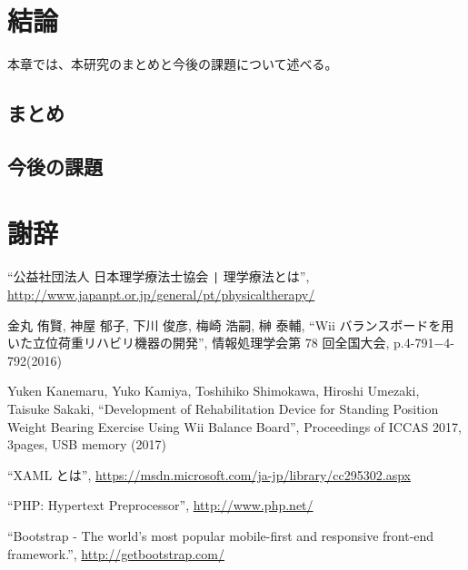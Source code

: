 \documentclass[uplatex,a4paper,12pt]{jsreport}
\begin{document}

\chapter{結論}\label{chap:keturon}
本章では、本研究のまとめと今後の課題について述べる。

\section{まとめ}\label{sec:matome}
 
\section{今後の課題}\label{sec:kadai}


\chapter*{謝辞}



\begin{thebibliography}{99}%

   ``公益社団法人 日本理学療法士協会 \verb+|+ 理学療法とは'',
  \url{http://www.japanpt.or.jp/general/pt/physicaltherapy/}
    
   金丸 侑賢, 神屋 郁子, 下川 俊彦, 梅崎 浩嗣, 榊 泰輔,
  ``Wii バランスボードを用いた立位荷重リハビリ機器の開発'', 
  情報処理学会第 78 回全国大会, p.4-791$−$4-792(2016)         

   Yuken Kanemaru, Yuko Kamiya, Toshihiko Shimokawa, Hiroshi Umezaki, Taisuke Sakaki, 
  ``Development of Rehabilitation Device for Standing Position Weight Bearing Exercise Using Wii Balance Board'',
  Proceedings of ICCAS 2017, 3pages, USB memory (2017)    

   ``XAML とは'',
  \url{https://msdn.microsoft.com/ja-jp/library/cc295302.aspx}

   ``PHP: Hypertext Preprocessor'',
  \url{ http://www.php.net/ }

   ``Bootstrap - The world's most popular mobile-first and responsive front-end framework.'',      
  \url{ http://getbootstrap.com/ }

\end{thebibliography}
\appendix
\end{document}
